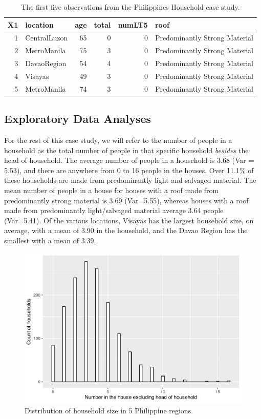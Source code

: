 \documentclass[
]{krantz}
\begin{document}
\begin{table}

\caption{\label{tab:fHH1table1}The first five observations from the Philippines Household case study.}
\centering
\begin{tabular}[t]{rlrrrl}
\toprule
X1 & location & age & total & numLT5 & roof\\
\midrule
1 & CentralLuzon & 65 & 0 & 0 & Predominantly Strong Material\\
2 & MetroManila & 75 & 3 & 0 & Predominantly Strong Material\\
3 & DavaoRegion & 54 & 4 & 0 & Predominantly Strong Material\\
4 & Visayas & 49 & 3 & 0 & Predominantly Strong Material\\
5 & MetroManila & 74 & 3 & 0 & Predominantly Strong Material\\
\bottomrule
\end{tabular}
\end{table}

\hypertarget{exploreHH}{%
\subsection{Exploratory Data Analyses}\label{exploreHH}}

For the rest of this case study, we will refer to the number of people in a household as the total number of people in that specific household \emph{besides} the head of household. The average number of people in a household is 3.68 (Var = 5.53), and there are anywhere from 0 to 16 people in the houses. Over 11.1\% of these households are made from predominantly light and salvaged material. The mean number of people in a house for houses with a roof made from predominantly strong material is 3.69 (Var=5.55), whereas houses with a roof made from predominantly light/salvaged material average 3.64 people (Var=5.41). Of the various locations, Visayas has the largest household size, on average, with a mean of 3.90 in the household, and the Davao Region has the smallest with a mean of 3.39.

\begin{figure}

{\centering \includegraphics[width=0.6\linewidth]{bookdown-BeyondMLR_files/figure-latex/nhouse-1} 

}

\caption{Distribution of household size in 5 Philippine regions.}\label{fig:nhouse}
\end{figure}
\end{document}

